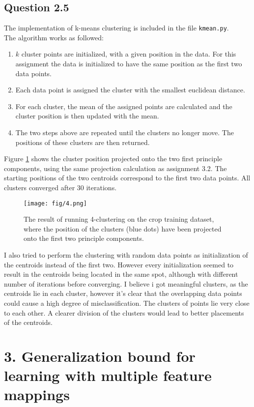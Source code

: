 \documentclass{article}
\begin{document}
\subsection{Question 2.5}
The implementation of k-means clustering is included in the file \texttt{kmean.py}. \\ The algorithm works as followed:
\begin{enumerate}
\item{$k$ cluster points are initialized, with a given position in the data. For this assignment the data is initialized to have the same position as the first two data points.}
\item{Each data point is assigned the cluster with the smallest euclidean distance.}
\item{For each cluster, the mean of the assigned points are calculated
and the cluster position is then updated with the mean.
}
\item{The two steps above are repeated until the clusters no longer move. The positions of these clusters are then returned.}
\end{enumerate}
Figure \ref{fig:clust1} shows the cluster position projected onto the two first principle components, using the same projection calculation as assignment 3.2. The starting positions of the two centroids correspond to the first two data points. All clusters converged after 30 iterations.
\begin{figure}[H]
  \centering
  \texttt{[image: fig/4.png]}
  \caption{The result of running 4-clustering on the crop training dataset, where the position of the clusters (blue dots) have been projected onto the first two principle components.
  }
  \label{fig:clust1}
\end{figure}
I also tried to perform the clustering with random data points as initialization of the centroids instead of the first two. However every initialization seemed to result in the centroids being located in the same spot, although with different number of iterations before converging. I believe i got meaningful clusters, as the centroids lie in each cluster, however it's clear that the overlapping data points could cause a high degree of misclassification. The clusters of points lie very close to each other. A clearer division of the clusters would lead to better placements of the centroids.
\section{3. Generalization bound for learning with multiple feature mappings}
\end{document}
